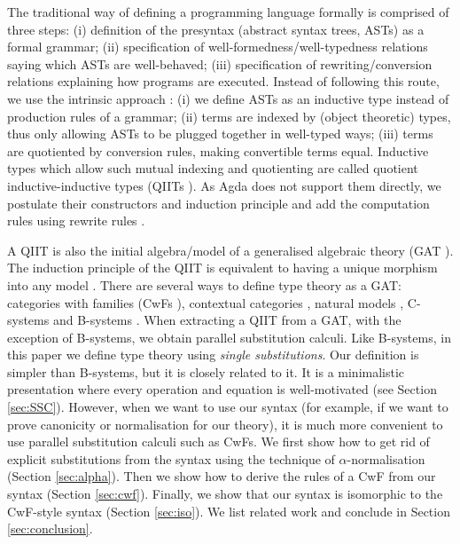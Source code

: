 \documentclass[a4paper]{article}
\begin{document}
The traditional way of defining a programming language formally
\cite{DBLP:books/daglib/0005958,DBLP:books/cu/Ha2016,Pierce:SF1,plfa22.08}
is comprised of three steps: (i) definition of the presyntax
(abstract syntax trees, ASTs) as a formal grammar; (ii) specification of
well-formedness/well-typedness relations saying which ASTs are
well-behaved; (iii) specification of rewriting/conversion relations
explaining how programs are executed. Instead of following this route,
we use the intrinsic approach
\cite{DBLP:conf/csl/AltenkirchR99,DBLP:conf/popl/AltenkirchK16}: (i)
we define ASTs as an inductive type instead of production rules of a
grammar; (ii) terms are indexed by (object theoretic) types, thus only
allowing ASTs to be plugged together in well-typed ways; (iii) terms
are quotiented by conversion rules, making convertible terms
equal. Inductive types which allow such mutual indexing and
quotienting are called quotient inductive-inductive types (QIITs
\cite{DBLP:journals/pacmpl/KaposiKA19}). As Agda does not support them
directly, we postulate their constructors and induction principle and add the
computation rules using rewrite rules \cite{DBLP:conf/types/Cockx19}.

A QIIT is also the initial algebra/model of a generalised algebraic
theory (GAT \cite{DBLP:journals/apal/Cartmell86}). The induction principle of
the QIIT is equivalent to having a unique morphism into any model
\cite{DBLP:journals/pacmpl/KaposiKA19}. There are several ways to
define type theory as a GAT: categories with families (CwFs
\cite{DBLP:journals/corr/abs-1904-00827}), contextual categories
\cite{DBLP:journals/apal/Cartmell86}, natural models
\cite{DBLP:journals/mscs/Awodey18}, C-systems and B-systems
\cite{ahrens_emmenegger_north_rijke_2023}. When extracting a QIIT from
a GAT, with the exception of B-systems, we obtain parallel
substitution calculi. Like B-systems, in this paper we define type
theory using \emph{single substitutions}. Our definition is simpler
than B-systems, but it is closely related to it. It is a minimalistic
presentation where every operation and equation is well-motivated (see
Section \ref{sec:SSC}). However, when we want to use our syntax (for
example, if we want to prove canonicity or normalisation for our
theory), it is much more convenient to use parallel substitution
calculi such as CwFs. We first show how to get rid of explicit
substitutions from the syntax using the technique of
$\alpha$-normalisation (Section \ref{sec:alpha}). Then we show how to
derive the rules of a CwF from our syntax (Section
\ref{sec:cwf}). Finally, we show that our syntax is isomorphic to the
CwF-style syntax (Section \ref{sec:iso}). We list related work and
conclude in Section \ref{sec:conclusion}.
\end{document}
